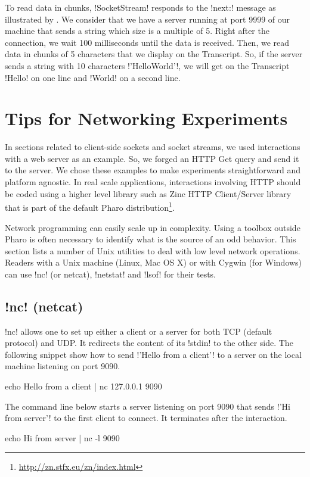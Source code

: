 \documentclass[a4paper,10pt,twoside]{book}
\begin{document}
To read data in chunks, \ct!SocketStream!  responds to the \ct!next:! message as illustrated by .
We consider that we have a server running at port 9999 of our machine that sends a string which size is a multiple of 5.
Right after the connection, we wait 100 milliseconds until the data is received.
Then, we read data in chunks of 5 characters that we display on the Transcript.
So, if the server sends a string with 10 characters \ct!'HelloWorld'!, we will get on the Transcript \ct!Hello! on one line and \ct!World! on a second line.

\section{Tips for Networking Experiments}
In sections related to client-side sockets and socket streams, we used interactions with a web server as an example. So, we forged an HTTP Get query and send it to the server.
We chose these examples to make experiments straightforward and platform agnostic.
In real scale applications, interactions involving HTTP should be coded using a higher level library such as Zinc HTTP Client/Server library that is part of the default Pharo distribution\footnote{\url{http://zn.stfx.eu/zn/index.html}}.

Network programming can easily scale up in complexity. Using a toolbox outside Pharo is often necessary to identify what is the source of an odd behavior. This section lists a number of Unix utilities to deal with low level network operations.
Readers with a Unix machine (Linux, Mac OS X) or with Cygwin (for Windows) can use \ct!nc! (or netcat), \ct!netstat! and \ct!lsof! for their tests.

\subsection{\ct!nc! (netcat)}\label{sec:netcat}
\ct!nc! allows one to set up either a client or a server for both TCP (default protocol) and UDP.
It redirects the content of its \ct!stdin! to the other side.
The following snippet show how to send \ct!'Hello from a client'! to a server on the local machine listening on port 9090.
\begin{code}{}
echo Hello from a client | nc 127.0.0.1 9090 
\end{code}

The command line below starts a server listening on port 9090 that sends \ct!'Hi from server'! to the first client to connect.
It terminates after the interaction.
\begin{code}{}
echo Hi from server | nc -l 9090 
\end{code}
\end{document}
